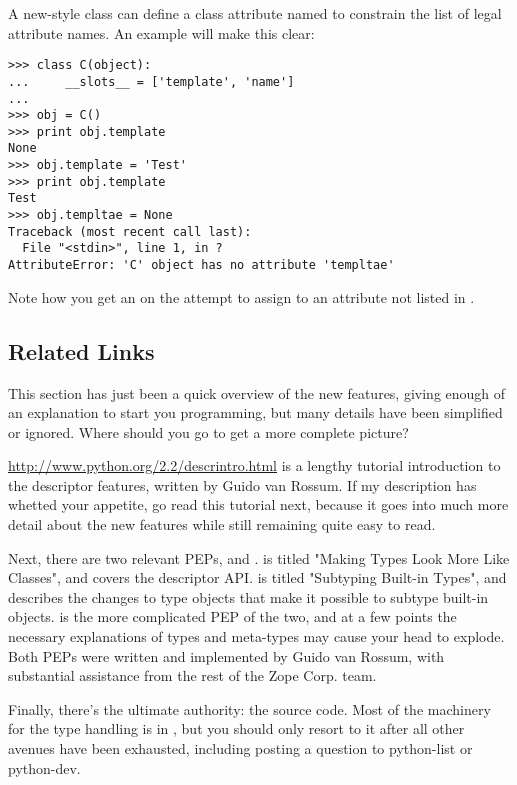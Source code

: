 \documentclass{howto}
\begin{document}
A new-style class can define a class attribute named 
to constrain the list of legal attribute names.  An example will make
this clear:

\begin{verbatim}
>>> class C(object):
...     __slots__ = ['template', 'name']
...
>>> obj = C()
>>> print obj.template
None
>>> obj.template = 'Test'
>>> print obj.template
Test
>>> obj.templtae = None
Traceback (most recent call last):
  File "<stdin>", line 1, in ?
AttributeError: 'C' object has no attribute 'templtae'
\end{verbatim}

Note how you get an  on the attempt to
assign to an attribute not listed in .


\subsection{Related Links}
\label{sect-rellinks}

This section has just been a quick overview of the new features,
giving enough of an explanation to start you programming, but many
details have been simplified or ignored.  Where should you go to get a
more complete picture?

\url{http://www.python.org/2.2/descrintro.html} is a lengthy tutorial
introduction to the descriptor features, written by Guido van Rossum.
If my description has whetted your appetite, go read this tutorial
next, because it goes into much more detail about the new features
while still remaining quite easy to read.

Next, there are two relevant PEPs,  and .  
is titled "Making Types Look More Like Classes", and covers the
descriptor API.   is titled "Subtyping Built-in Types", and
describes the changes to type objects that make it possible to subtype
built-in objects.   is the more complicated PEP of the two,
and at a few points the necessary explanations of types and meta-types
may cause your head to explode.  Both PEPs were written and
implemented by Guido van Rossum, with substantial assistance from the
rest of the Zope Corp. team.

Finally, there's the ultimate authority: the source code.  Most of the
machinery for the type handling is in , but
you should only resort to it after all other avenues have been
exhausted, including posting a question to python-list or python-dev. 
\end{document}
